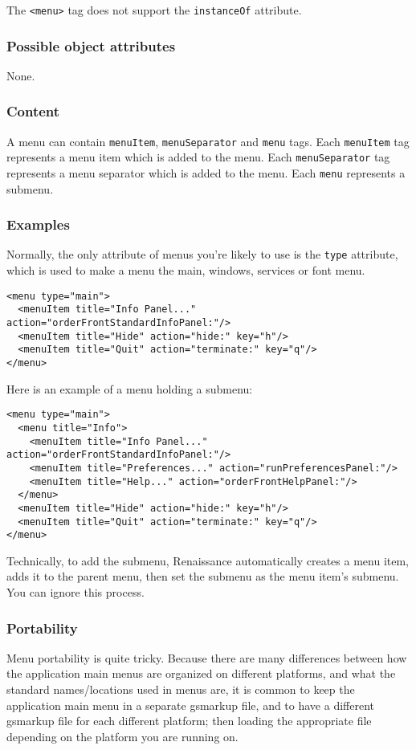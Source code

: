 The \texttt{<menu>} tag does not support the \texttt{instanceOf} attribute.

\subsubsection{Possible object attributes}
None.

\subsubsection{Content}
A menu can contain \texttt{menuItem}, \texttt{menuSeparator} and
\texttt{menu} tags.  Each \texttt{menuItem} tag represents a menu item
which is added to the menu.  Each \texttt{menuSeparator} tag
represents a menu separator which is added to the menu.  Each
\texttt{menu} represents a submenu.

\subsubsection{Examples}
Normally, the only attribute of menus you're likely to use is the 
\texttt{type} attribute, which is used to make a menu the main, windows, 
services or font menu.
\begin{verbatim}
<menu type="main">
  <menuItem title="Info Panel..." action="orderFrontStandardInfoPanel:"/>
  <menuItem title="Hide" action="hide:" key="h"/>
  <menuItem title="Quit" action="terminate:" key="q"/>
</menu>
\end{verbatim}

Here is an example of a menu holding a submenu:
\begin{verbatim}
<menu type="main">
  <menu title="Info">
    <menuItem title="Info Panel..." action="orderFrontStandardInfoPanel:"/>
    <menuItem title="Preferences..." action="runPreferencesPanel:"/>
    <menuItem title="Help..." action="orderFrontHelpPanel:"/>
  </menu>
  <menuItem title="Hide" action="hide:" key="h"/>
  <menuItem title="Quit" action="terminate:" key="q"/>
</menu>
\end{verbatim}
Technically, to add the submenu, Renaissance automatically creates a
menu item, adds it to the parent menu, then set the submenu as the
menu item's submenu.  You can ignore this process.

\subsubsection{Portability}
Menu portability is quite tricky.  Because there are many differences
between how the application main menus are organized on different
platforms, and what the standard names/locations used in menus are, it
is common to keep the application main menu in a separate gsmarkup
file, and to have a different gsmarkup file for each different
platform; then loading the appropriate file depending on the platform
you are running on.


